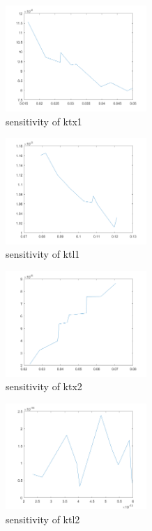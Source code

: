\begin{figure}[H]
	\centering
	\begin{subfigure}{0.5\textwidth}
		\includegraphics[height=4cm]{tx1.png}
		\caption{sensitivity of ktx1}
	\end{subfigure}
	\begin{subfigure}{0.5\textwidth}
		\includegraphics[height=4cm]{tl1.png}
		\caption{sensitivity of ktl1}
	\end{subfigure}
	\begin{subfigure}{0.5\textwidth}
		\includegraphics[height=4cm]{tx2.png}
		\caption{sensitivity of ktx2}
	\end{subfigure}%
	\begin{subfigure}{0.5\textwidth}
		\includegraphics[height=4cm]{tl2.png}
		\caption{sensitivity of ktl2}
	\end{subfigure}
	\begin{subfigure}{0.5\textwidth}

\end{subfigure}
\end{figure}
